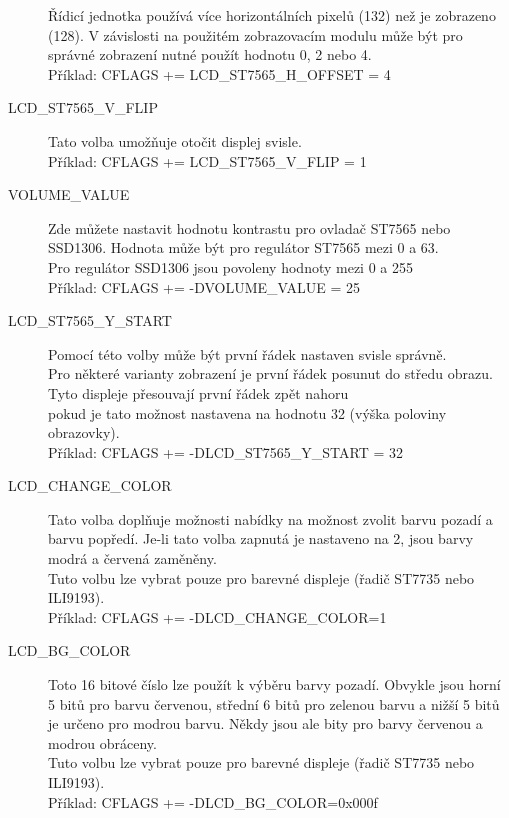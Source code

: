 \begin{description}
Řídicí jednotka používá více horizontálních pixelů (132) než je zobrazeno (128).
V závislosti na použitém zobrazovacím modulu může být pro správné zobrazení nutné použít hodnotu 0, 2 nebo 4.
\\Příklad: CFLAGS += LCD\_ST7565\_H\_OFFSET = 4
\vspace{-0,3cm}
\item[LCD\_ST7565\_V\_FLIP] Tato volba umožňuje otočit displej svisle.\\
Příklad: CFLAGS += LCD\_ST7565\_V\_FLIP = 1
\vspace{-0,3cm}
\item[VOLUME\_VALUE] Zde můžete nastavit hodnotu kontrastu pro ovladač ST7565 nebo SSD1306.
Hodnota může být pro regulátor ST7565 mezi 0 a 63.\\
Pro regulátor SSD1306 jsou povoleny hodnoty mezi 0 a 255 \\
Příklad: CFLAGS += -DVOLUME\_VALUE = 25
\vspace{-0,3cm}
\item[LCD\_ST7565\_Y\_START] Pomocí této volby může být první řádek nastaven svisle správně.\\
Pro některé varianty zobrazení je první řádek posunut do středu obrazu.\\
Tyto displeje přesouvají první řádek zpět nahoru\\
pokud je tato možnost nastavena na hodnotu 32 (výška poloviny obrazovky).\\
Příklad: CFLAGS += -DLCD\_ST7565\_Y\_START = 32
\vspace{-0,3cm}
\item[LCD\_CHANGE\_COLOR]  Tato volba doplňuje možnosti nabídky na možnost
zvolit barvu pozadí a barvu popředí. Je-li tato volba zapnutá
je nastaveno na 2, jsou barvy modrá a červená zaměněny.\\
Tuto volbu lze vybrat pouze pro barevné displeje (řadič ST7735 nebo ILI9193).\\
Příklad: CFLAGS += -DLCD\_CHANGE\_COLOR=1
\vspace{-0,3cm}
 \item[LCD\_BG\_COLOR] Toto 16 bitové číslo lze použít k výběru barvy pozadí.
Obvykle jsou horní 5 bitů pro barvu červenou, střední 6 bitů pro zelenou barvu
a nižší 5 bitů je určeno pro modrou barvu. Někdy jsou ale bity pro barvy
červenou a modrou obráceny.\\
Tuto volbu lze vybrat pouze pro barevné displeje (řadič ST7735 nebo ILI9193).\\
Příklad: CFLAGS += -DLCD\_BG\_COLOR=0x000f

\end{description}
